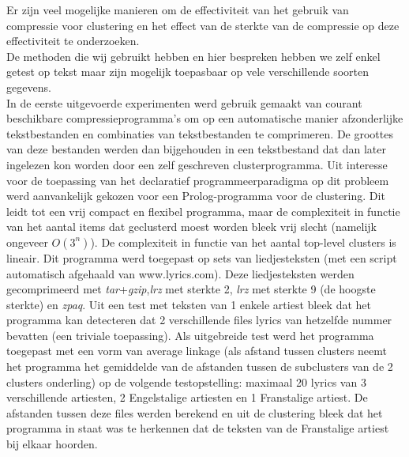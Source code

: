 \documentclass[twoside]{article}
\begin{document}
\begin{multicols}{2}
Er zijn veel mogelijke manieren om de effectiviteit van het gebruik van compressie voor
clustering en het effect van de sterkte van de compressie op deze effectiviteit te
onderzoeken.
\\
De methoden die wij gebruikt hebben en hier bespreken hebben we zelf enkel getest op tekst
maar zijn mogelijk toepasbaar op vele verschillende soorten gegevens.
\\
In de eerste uitgevoerde experimenten werd gebruik gemaakt van courant beschikbare 
compressieprogramma's om op een automatische manier afzonderlijke tekstbestanden en 
combinaties van tekstbestanden te comprimeren. De groottes van deze bestanden werden dan
bijgehouden in een tekstbestand dat dan later ingelezen kon worden door een zelf geschreven
clusterprogramma.
Uit interesse voor de toepassing van het declaratief programmeerparadigma op dit probleem
werd aanvankelijk gekozen voor een Prolog-programma voor de clustering.
Dit leidt tot een vrij compact en flexibel programma, maar de complexiteit in functie van 
het aantal items dat geclusterd moest worden bleek vrij slecht (namelijk ongeveer $O(3^n)$).
De complexiteit in functie van het aantal top-level clusters is lineair.
Dit programma werd toegepast op sets van liedjesteksten (met een script automatisch 
afgehaald van www.lyrics.com).
Deze liedjesteksten werden gecomprimeerd met \emph{tar}+\emph{gzip},\emph{lrz} met sterkte 2,
 \emph{lrz} met sterkte 9 (de hoogste sterkte) en \emph{zpaq}.
Uit een test met teksten van 1 enkele artiest bleek dat het programma kan detecteren dat 2 
verschillende files lyrics van hetzelfde nummer bevatten (een triviale toepassing).
Als uitgebreide test werd het programma toegepast met een vorm van average linkage 
(als afstand tussen clusters neemt het programma het gemiddelde van de afstanden tussen de subclusters van de 2 clusters onderling) 
op de volgende testopstelling: maximaal 20 lyrics van 3 verschillende artiesten, 
2 Engelstalige artiesten en 1 Franstalige artiest. 
De afstanden tussen deze files werden berekend en uit de clustering bleek dat het programma
in staat was te herkennen dat de teksten van de Franstalige artiest bij elkaar hoorden.

\end{multicols}
\end{document}

